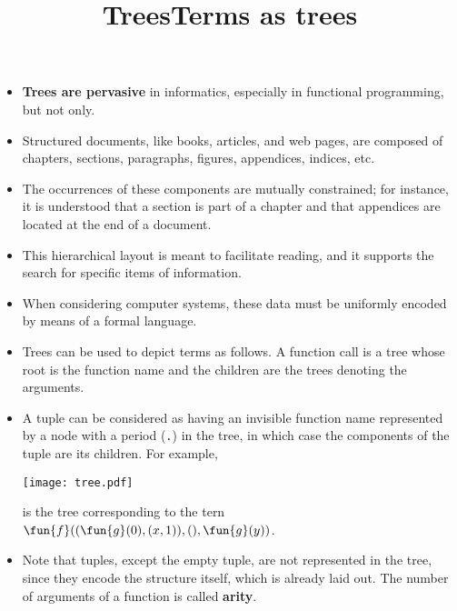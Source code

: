 \documentclass[wide]{slides}
\begin{document}
\begin{slide}
  \title{Trees}

  \begin{itemize}

    \item \textbf{Trees are pervasive} in informatics, especially in
      functional programming, but not only.

    \item Structured documents, like books, articles, and web pages,
      are composed of chapters, sections, paragraphs, figures,
      appendices, indices, etc.

    \item The occurrences of these components are mutually
      constrained; for instance, it is understood that a section is
      part of a chapter and that appendices are located at the end of
      a document.

    \item This hierarchical layout is meant to facilitate reading, and
      it supports the search for specific items of information.

    \item When considering computer systems, these data must be
      uniformly encoded by means of a formal language.

  \end{itemize}

\end{slide}


\begin{slide}
  \title{Terms as trees}

  \begin{itemize}

    \item Trees can be used to depict terms as follows. A function
      call is a tree whose root is the function name and the children
      are the trees denoting the arguments.

    \item A tuple can be considered as having an invisible function
      name represented by a node with a period (\texttt{.}) in the
      tree, in which case the components of the tuple are its
      children. For example,
      \begin{center}
        \texttt{[image: tree.pdf]}
      \end{center}
      is the tree corresponding to the tern
      \(\fun{f}((\fun{g}(0),(x,1)),(),\fun{g}(y))\).

    \item Note that tuples, except the empty tuple, are not
      represented in the tree, since they encode the structure itself,
      which is already laid out. The number of arguments of a function
      is called \textbf{arity}.

  \end{itemize}

\end{slide}
\end{document}
